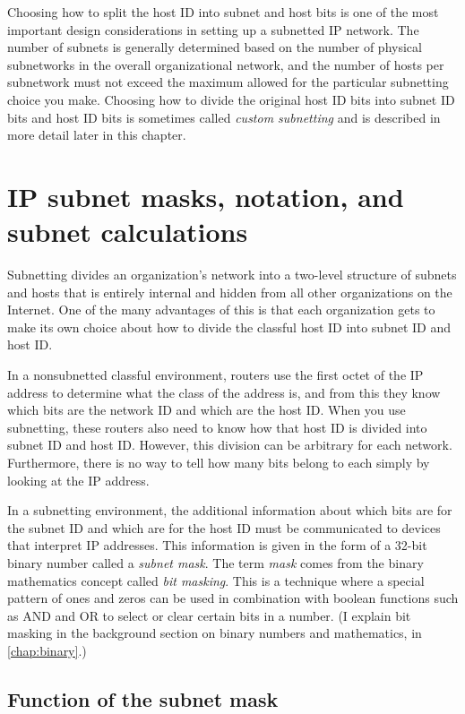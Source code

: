 Choosing how to split the host ID into subnet and host bits is one of
the most important design considerations in setting up a subnetted IP
network. The number of subnets is generally determined based on the
number of physical subnetworks in the overall organizational network,
and the number of hosts per subnetwork must not exceed the maximum
allowed for the particular subnetting choice you make. Choosing how to
divide the original host ID bits into subnet ID bits and host ID bits is
sometimes called {\emph{custom subnetting}} and is described in more
detail later in this chapter.



\section{IP subnet masks, notation, and subnet calculations}

Subnetting divides an organization's network into a two-level structure of subnets
and hosts that is entirely internal and hidden from all other
organizations on the Internet. One of the many advantages of this is
that each organization gets to make its own choice about how to divide
the classful host ID into subnet ID and host ID.

In a nonsubnetted classful environment, routers use the first octet of
the IP address to determine what the class of the address is, and from
this they know which bits are the network ID and which are the host ID.
When you use subnetting, these routers also need to know how that host
ID is divided into subnet ID and host ID. However, this division can be
arbitrary for each network. Furthermore, there is no way to tell how
many bits belong to each simply by looking at the IP address.

In a subnetting environment, the additional information about which bits
are for the subnet ID and which are for the host ID must be communicated
to devices that interpret IP addresses. This information is given in the
form of a 32-bit binary number called a {\emph{subnet mask}}.
The term \emph{mask} comes from the binary mathematics concept called \emph{bit masking}.
This is a technique where a special pattern of ones and zeros
can be used in combination with boolean functions such as AND and OR to
select or clear certain bits in a number. (I explain bit masking in the
background section on binary numbers and mathematics, in \vref{chap:binary}.)



\subsection{Function of the subnet mask}

